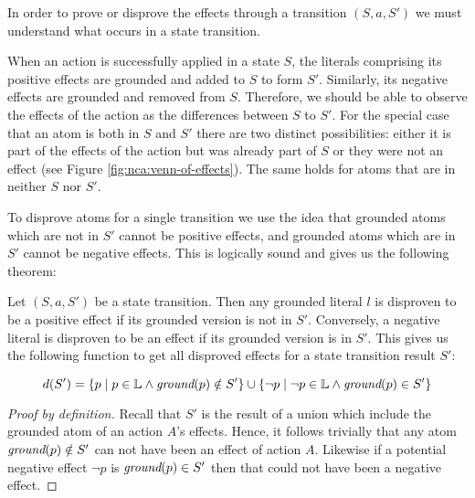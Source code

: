 \documentclass[../Master.tex]{subfiles}
\begin{document}
In order to prove or disprove the effects through a transition $(S,a,S')$ we must understand what occurs in a state transition.

When an action is successfully applied in a state $S$, the literals comprising its positive effects are grounded and added to $S$ to form $S'$. Similarly, its negative effects are grounded and removed from $S$. Therefore, we should be able to observe the effects of the action as the differences between $S$ to $S'$. For the special case that an atom is both in $S$ and $S'$ there are two distinct possibilities: either it is part of the effects of the action but was already part of $S$ or they were not an effect (see Figure \ref{fig:nca:venn-of-effects}). The same holds for atoms that are in neither $S$ nor $S'$.

To disprove atoms for a single transition we use the idea that grounded atoms which are not in $S'$ cannot be positive effects, and grounded atoms which are in $S'$ cannot be negative effects. 
This is logically sound and gives us the following theorem:

\begin{theorem}
	 Let $\left(S, a, S'\right)$ be a state transition. Then any grounded literal $l$ is disproven to be a positive effect if its grounded version is not in $S'$. Conversely, a negative literal is disproven to be an effect if its grounded version is in $S'$. This gives us the following function to get all disproved effects for a state transition result $S'$:
	
	\begin{equation*}
		 d(S') = \left\{
			p \mid p \in \mathbb{L} \land \textit{ground} (p) \notin S'
			\right\} 
			\cup
			 \left\{
			\neg p \mid \neg p \in \mathbb{L} \land \textit{ground}(p) \in S'
			\right\}
	\end{equation*}
\end{theorem}
	\begin{proof}[Proof by definition]
		Recall that $S'$ is the result of a union which include the grounded atom of an action $A$'s effects. Hence, it follows trivially that any atom $\textit{ground}(p) \notin S'$ can not have been an effect of action $A$.
	Likewise if a potential negative effect $\neg p$ is $\textit{ground}(p) \in S'$ then that could not have been a negative effect.
	\end{proof}
\end{document}
